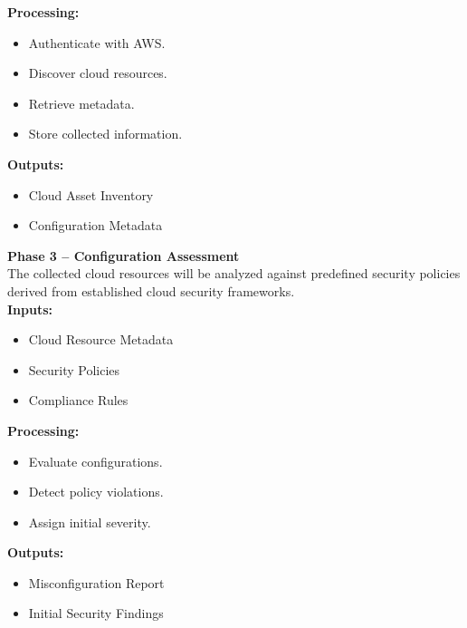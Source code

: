 \textbf{Processing:}

\begin{itemize}
\tightlist
\item
  Authenticate with AWS.\\
\item
  Discover cloud resources.\\
\item
  Retrieve metadata.\\
\item
  Store collected information.
\end{itemize}

\textbf{Outputs:}

\begin{itemize}
\tightlist
\item
  Cloud Asset Inventory\\
\item
  Configuration Metadata
\end{itemize}

\textbf{Phase 3 -- Configuration Assessment}\\
The collected cloud resources will be analyzed against predefined security policies derived from established cloud security frameworks.\\
\textbf{Inputs:}

\begin{itemize}
\tightlist
\item
  Cloud Resource Metadata\\
\item
  Security Policies\\
\item
  Compliance Rules
\end{itemize}

\textbf{Processing:}

\begin{itemize}
\tightlist
\item
  Evaluate configurations.\\
\item
  Detect policy violations.\\
\item
  Assign initial severity.
\end{itemize}

\textbf{Outputs:}

\begin{itemize}
\tightlist
\item
  Misconfiguration Report\\
\item
  Initial Security Findings
\end{itemize}


